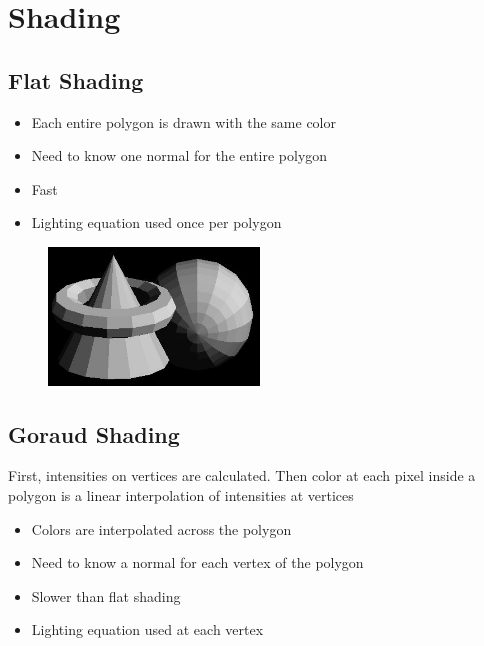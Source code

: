 \documentclass{mini}
\begin{document}
\section{Shading}

\subsection{Flat Shading}
\begin{itemize}
    \item Each entire polygon is drawn with the same color
    \item Need to know one normal for the entire polygon
    \item Fast
    \item Lighting equation used once per polygon
\end{itemize}

\begin{figure}[H]
    \centering
    \includegraphics[width=0.5\textwidth]{./images/flat_shade.jpg}
    \caption{}
    \label{fig:flat_shade}
\end{figure}


\subsection{Goraud Shading}
First, intensities on vertices are calculated. Then color at each pixel inside a polygon is a linear interpolation of intensities at vertices
\begin{itemize}
   
    \item Colors are interpolated across the polygon
    \item Need to know a normal for each vertex of the polygon
    \item Slower than flat shading
    \item Lighting equation used at each vertex
\end{itemize}
\end{document}
